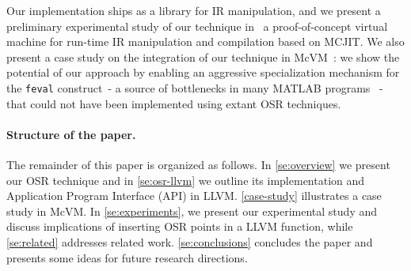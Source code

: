 \noindent Our implementation ships as a library for IR manipulation, and we present a preliminary experimental study of our technique in \tinyvm\, a proof-of-concept virtual machine for run-time IR manipulation and compilation based on MCJIT. We also present a case study on the integration of our technique in McVM~\cite{chevalier2010mcvm}: we show the potential of our approach by enabling an aggressive specialization mechanism for the {\tt feval} construct\ - a source of bottlenecks in many MATLAB programs~\cite{radpour2013refactoring, lameed2013feval} - that could not have been implemented using extant OSR techniques.

\paragraph{Structure of the paper.}
The remainder of this paper is organized as follows. In \mysection\ref{se:overview} we present our OSR technique and in \mysection\ref{se:osr-llvm} we outline its implementation and Application Program Interface (API) in LLVM. \mysection\ref{case-study} illustrates a case study in McVM. In \mysection\ref{se:experiments}, we present our experimental study and discuss implications of inserting OSR points in a LLVM function, while \mysection\ref{se:related} addresses related work. \mysection\ref{se:conclusions} concludes the paper and presents some ideas for future research directions.